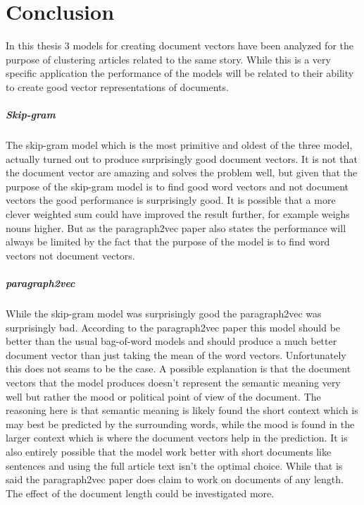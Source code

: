 \chapter{Conclusion}

In this thesis 3 models for creating document vectors have been analyzed for the purpose of clustering articles related to the same story. While this is a very specific application the performance of the models will be related to their ability to create good vector representations of documents.

\paragraph{Skip-gram} The skip-gram model which is the most primitive and oldest of the three model, actually turned out to produce surprisingly good document vectors. It is not that the document vector are amazing and solves the problem well, but given that the purpose of the skip-gram model is to find good word vectors and not document vectors the good performance is surprisingly good. It is possible that a more clever weighted sum could have improved the result further, for example weighs nouns higher. But as the paragraph2vec paper \cite{doc2vec} also states the performance will always be limited by the fact that the purpose of the model is to find word vectors not document vectors.

\paragraph{paragraph2vec} While the skip-gram model was surprisingly good the paragraph2vec was surprisingly bad. According to the paragraph2vec paper \cite{doc2vec} this model should be better than the usual bag-of-word models and should produce a much better document vector than just taking the mean of the word vectors. Unfortunately this does not seams to be the case. A possible explanation is that the document vectors that the model produces doesn't represent the semantic meaning very well but rather the mood or political point of view of the document. The reasoning here is that semantic meaning is likely found the short context which is may best be predicted by the surrounding words, while the mood is found in the larger context which is where the document vectors help in the prediction. It is also entirely possible that the model work better with short documents like sentences and using the full article text isn't the optimal choice. While that is said the paragraph2vec paper \cite{doc2vec} does claim to work on documents of any length. The effect of the document length could be investigated more.


